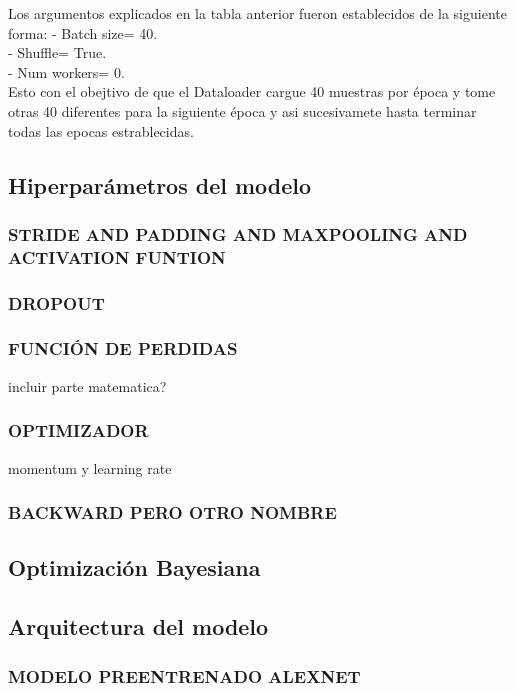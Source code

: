 		Los argumentos explicados en la tabla anterior fueron establecidos de la siguiente forma:
		- Batch size= 40. \\
		- Shuffle= True. \\
		- Num workers= 0. \\
		Esto con el obejtivo de que el Dataloader cargue 40 muestras por época y tome otras 40 diferentes para la siguiente época y asi sucesivamete hasta terminar todas las epocas estrablecidas.  
		
		
		
			
		
		\subsection{Hiperparámetros del modelo}
			\subsubsection{\MakeUppercase{Stride and Padding and maxpooling and activation funtion}}
			\subsubsection{\MakeUppercase{Dropout}}
			\subsubsection{\MakeUppercase{Función de perdidas}}
			incluir parte matematica?
			\subsubsection{\MakeUppercase{Optimizador}}
			momentum y learning rate
			\subsubsection{\MakeUppercase{Backward pero otro nombre}}
			
			
		\subsection{Optimización Bayesiana}	
			
			
		\subsection{Arquitectura del modelo}
			\subsubsection{\MakeUppercase{Modelo preentrenado ALEXNET}}
